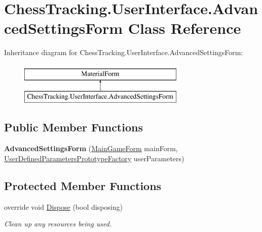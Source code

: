 \hypertarget{class_chess_tracking_1_1_user_interface_1_1_advanced_settings_form}{}\section{Chess\+Tracking.\+User\+Interface.\+Advanced\+Settings\+Form Class Reference}
\label{class_chess_tracking_1_1_user_interface_1_1_advanced_settings_form}
Inheritance diagram for Chess\+Tracking.\+User\+Interface.\+Advanced\+Settings\+Form\+:\begin{figure}[H]
\begin{center}
\leavevmode
\includegraphics[height=2.000000cm]{class_chess_tracking_1_1_user_interface_1_1_advanced_settings_form}
\end{center}
\end{figure}
\subsection*{Public Member Functions}
\begin{DoxyCompactItemize}
\item 
\mbox{\label{class_chess_tracking_1_1_user_interface_1_1_advanced_settings_form_aecb1409b99bd7efe53a44e6851a5ca3a}} 
{\bfseries Advanced\+Settings\+Form} (\mbox{\hyperlink{class_chess_tracking_1_1_user_interface_1_1_main_game_form}{Main\+Game\+Form}} main\+Form, \mbox{\hyperlink{class_chess_tracking_1_1_image_processing_1_1_pipeline_data_1_1_user_defined_parameters_prototype_factory}{User\+Defined\+Parameters\+Prototype\+Factory}} user\+Parameters)
\end{DoxyCompactItemize}
\subsection*{Protected Member Functions}
\begin{DoxyCompactItemize}
\item 
override void \mbox{\hyperlink{class_chess_tracking_1_1_user_interface_1_1_advanced_settings_form_af2a4b6fa07248148f528d5c5a6425b27}{Dispose}} (bool disposing)
\begin{DoxyCompactList}\small\item\em Clean up any resources being used. \end{DoxyCompactList}\end{DoxyCompactItemize}
